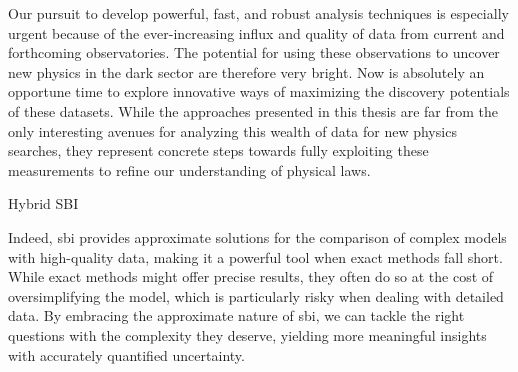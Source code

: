 Our pursuit to develop powerful, fast, and robust analysis techniques is especially urgent because of the ever-increasing influx and quality of data from current and forthcoming observatories.
The potential for using these observations to uncover new physics in the dark sector are therefore very bright. Now is absolutely an opportune time to explore innovative ways of maximizing the discovery potentials of these datasets. While the approaches presented in this thesis are far from the only interesting avenues for analyzing this wealth of data for new physics searches, they represent concrete steps towards fully exploiting these measurements to refine our understanding of physical laws.

Hybrid SBI \cite{Modi:2023drt}



Indeed, \gls*{sbi} provides approximate solutions for the comparison of complex models with high-quality data, making it a powerful tool when exact methods fall short. While exact methods might offer precise results, they often do so at the cost of oversimplifying the model, which is particularly risky when dealing with detailed data. By embracing the approximate nature of \gls*{sbi}, we can tackle the right questions with the complexity they deserve, yielding more meaningful insights with accurately quantified uncertainty.

%




